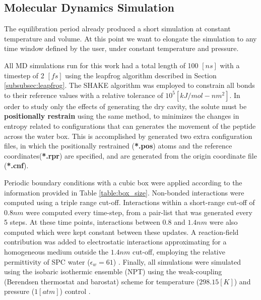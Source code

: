 \subsection{Molecular Dynamics Simulation}\label{subsec:MDS}
The equilibration period already produced a short simulation at constant temperature and volume. At this point we want to elongate the simulation to any time window defined by the user, under constant temperature and pressure.

All MD simulations run for this work had a total length of 100 $[ns]$ with a timestep of 2 $[fs]$ using the leapfrog algorithm described in Section \ref{subsubsec:leapfrog}. The SHAKE algorithm \cite{ryckaert1977numerical} was employed to constrain all bonds to their reference values with a relative tolerance of $10^5 [kJ/mol-nm^{2}]$. In order to study only the effects of generating the dry cavity, the solute must be \textbf{positionally restrain} using the same method, to minimizes the changes in entropy related to configurations that can generates the movement of the peptide across the water box. This is accomplished by generated two extra configuration files, in which the positionally restrained (\textbf{*.pos}) atoms and the reference coordinates(\textbf{*.rpr}) are specified, and are generated from the origin coordinate file (\textbf{*.cnf}).

Periodic boundary conditions with a cubic box were applied according to the information provided in Table \ref{table:box_size}.
Non-bonded interactions were computed using a triple range cut-off. Interactions within a short-range cut-off of $0.8 nm$ were computed every time-step, from a pair-list that was generated every 5 steps. At these time points, interactions between $0.8$ and $1.4 nm$ were also computed which were kept constant between these updates. A reaction-field contribution was added to electrostatic interactions approximating for a homogeneous medium outside the $1.4 nm$ cut-off, employing the relative permittivity of SPC water ($\epsilon_w=61$) \cite{tironi1995generalized}. Finally, all simulations were simulated using the isobaric isothermic ensemble (NPT) using the weak-coupling (Berendsen thermostat and barostat) scheme for temperature ($298.15 [K]$) and pressure ($1 [atm]$) control \cite{berendsen1984molecular}. 

